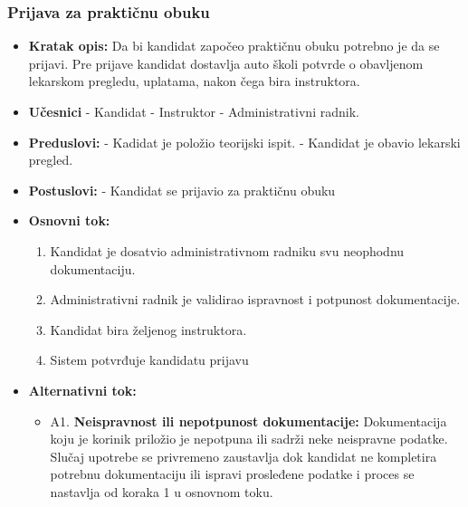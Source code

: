 \subsubsection{Prijava za praktičnu obuku}

\vspace{3mm}

\begin{itemize}

\item \textbf{Kratak opis:} Da bi kandidat započeo praktičnu obuku potrebno je da se prijavi. Pre prijave kandidat dostavlja auto školi potvrde o obavljenom lekarskom pregledu, uplatama, nakon čega bira instruktora.

\vspace{2mm}

\item \textbf{Učesnici} \newline
   - Kandidat \newline 
   - Instruktor \newline 
   - Administrativni radnik.

\item \textbf{Preduslovi:} \newline
   - Kadidat je položio teorijski ispit. \newline 
   - Kandidat je obavio lekarski pregled. 

\item \textbf{Postuslovi:} \newline
    - Kandidat se prijavio za praktičnu obuku 

\item \textbf{Osnovni tok:}  
   \begin{enumerate}
   \item Kandidat je dosatvio administrativnom radniku svu neophodnu dokumentaciju.
   \item Administrativni radnik je validirao ispravnost i potpunost dokumentacije.
   \item Kandidat bira željenog instruktora.
   \item Sistem potvrđuje kandidatu prijavu
   \end{enumerate}

\item \textbf{Alternativni tok:}  
   \begin{itemize}
   \item A1. \textbf{Neispravnost ili nepotpunost dokumentacije:}
  Dokumentacija koju je korinik priložio je nepotpuna ili sadrži neke neispravne podatke. Slučaj upotrebe se privremeno zaustavlja dok kandidat ne kompletira potrebnu dokumentaciju ili ispravi prosleđene podatke i proces se nastavlja od koraka 1 u osnovnom toku.
   \end{itemize}

\end{itemize}  
